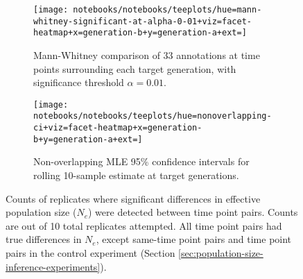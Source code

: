 \begin{figure}
  \centering

  \begin{subfigure}{\textwidth}
    \begin{minipage}{0.7\textwidth}
      \texttt{[image: notebooks/notebooks/teeplots/hue=mann-whitney-significant-at-alpha-0-01+viz=facet-heatmap+x=generation-b+y=generation-a+ext=]}
    \end{minipage}%
    \begin{minipage}{0.25\textwidth}
      \caption{Mann-Whitney comparison of 33 annotations at time points surrounding each target generation, with significance threshold $\alpha = 0.01$.}
      \label{fig:ne-detection-matrix:mann-whitney}
    \end{minipage}
  \end{subfigure}

  \vspace{1em} %

  \begin{subfigure}{\textwidth}
    \begin{minipage}{0.7\textwidth}
      \texttt{[image: notebooks/notebooks/teeplots/hue=nonoverlapping-ci+viz=facet-heatmap+x=generation-b+y=generation-a+ext=]}
    \end{minipage}%
    \begin{minipage}{0.25\textwidth}
      \caption{Non-overlapping MLE 95\% confidence intervals for rolling 10-sample estimate at target generations.}
      \label{fig:ne-detection-matrix:ci}
    \end{minipage}
  \end{subfigure}

  \caption{Counts of replicates where significant differences in effective population size ($N_e$) were detected between time point pairs.
  Counts are out of 10 total replicates attempted.
  All time point pairs had true differences in $N_e$, except same-time point pairs and time point pairs in the control experiment (Section \ref{sec:population-size-inference-experiments}).
  }
  \label{fig:ne-detection-matrix}
\end{figure}

%
